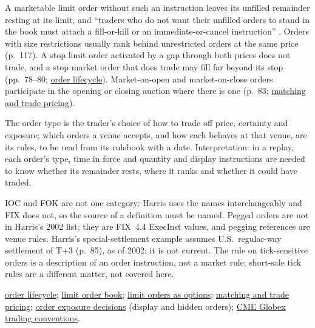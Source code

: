\begin{qfdefinition}
A marketable limit order without such an instruction leaves its unfilled remainder resting at its limit, and ``traders who do not want their unfilled orders to stand in the book must attach a fill-or-kill or an immediate-or-cancel instruction'' \citep[chap.~6, sec.~6.4, p.~126]{alpha-harris}. Orders with size restrictions usually rank behind unrestricted orders at the same price (p.~117). A stop limit order activated by a gap through both prices does not trade, and a stop market order that does trade may fill far beyond its stop (pp.~78--80; \hyperref[mech:order-lifecycle]{order lifecycle}). Market-on-open and market-on-close orders participate in the opening or closing auction where there is one (p.~83; \hyperref[mech:order-matching-pricing]{matching and trade pricing}).

 The order type is the trader's choice of how to trade off price, certainty and exposure; which orders a venue accepts, and how each behaves at that venue, are its rules, to be read from its rulebook with a date. Interpretation: in a replay, each order's type, time in force and quantity and display instructions are needed to know whether its remainder rests, where it ranks and whether it could have traded.

 IOC and FOK are not one category: Harris uses the names interchangeably and FIX does not, so the source of a definition must be named. Pegged orders are not in Harris's 2002 list; they are FIX~4.4 ExecInst values, and pegging references are venue rules. Harris's special-settlement example assumes U.S.\ regular-way settlement of T+3 (p.~85), as of 2002; it is not current. The rule on tick-sensitive orders is a description of an order instruction, not a market rule; short-sale tick rules are a different matter, not covered here.

 \hyperref[mech:order-lifecycle]{order lifecycle}; \hyperref[def:limit-order-book]{limit order book}; \hyperref[res:limit-order-options]{limit orders as options}; \hyperref[mech:order-matching-pricing]{matching and trade pricing}; \hyperref[def:order-exposure-decisions]{order exposure decisions} (display and hidden orders); \hyperref[conv:cme-globex-trading]{CME Globex trading conventions}.

\end{qfdefinition}

